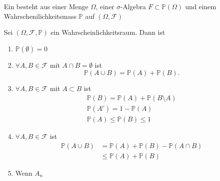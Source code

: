 \begin{definition}
    Ein  besteht aus einer Menge $\Omega$, einer  $\sigma$-Algebra $F\subset \mathbb{P}\mathcal{(\Omega)}$ und einem Wahrschenilichkeitsmass $\mathbb{P}$ auf $(\Omega, \mathcal{F})$ 
\end{definition}


\begin{lemma}
    Sei $(\Omega, \mathcal{F}, \mathbb{P})$ ein Wahrscheinlichkeitsraum. Dann ist
\begin{enumerate}[label=\protect\circled{\alph*}]
    \item $\mathbb{P}(\emptyset)=0$ 
    \item $\forall A,B\in \mathcal{F}$ mit $A\cap B = \emptyset$ ist
        \[
            \mathbb{P}(A\cup B ) = \mathbb{P}(A) + \mathbb{P}(B)
        .\] 
    \item      $\forall A,B\in \mathcal{F}$ mit $A\subset B$ ist 
        \begin{equation}
            \begin{split}
        \mathbb{P}(B) = \mathbb{P}(A) + \mathbb{P}(B \setminus A)  \\
                \mathbb{P}(A^{c}) = 1 - \mathbb{P}(A) \\
                \mathbb{P}(A) \leq  \mathbb{P}(B) \leq  1
            \end{split}
        \end{equation}
    \item $\forall A,B \in \mathcal{F}$ ist
        \begin{equation}
            \begin{split}
                \mathbb{P}(A \cup B) &= \mathbb{P}(A) + \mathbb{P}(B) - \mathbb{P}(A\cap B) \\
                                     &\leq  \mathbb{P}(A) + \mathbb{P}(B)
            \end{split}
        \end{equation}
    \item Wenn $A_n $
\end{enumerate}
\end{lemma}
